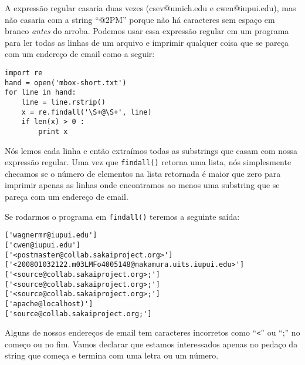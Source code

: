 A expressão regular casaria duas vezes (csev@umich.edu e cwen@iupui.edu), mas não casaria com a
string ``@2PM'' porque não há caracteres sem espaço em branco {\em antes} do arroba.
Podemos usar essa expressão regular em um programa para ler todas as linhas de um arquivo e 
imprimir qualquer coisa que se pareça com um endereço de email como a seguir: 

\beforeverb
\begin{verbatim}
import re
hand = open('mbox-short.txt')
for line in hand:
    line = line.rstrip()
    x = re.findall('\S+@\S+', line)
    if len(x) > 0 :
        print x
\end{verbatim}
\afterverb
%

Nós lemos cada linha e então extraímos todas as substrings que casam com nossa expressão regular.
Uma vez que {\tt findall()} retorna uma lista, nós simplesmente checamos se o número de elementos
na lista retornada é maior que zero para imprimir apenas as linhas onde encontramos ao menos uma 
substring que se pareça com um endereço de email.

Se rodarmos o programa em {\tt findall()} teremos a seguinte saída:

\beforeverb
\begin{verbatim}
['wagnermr@iupui.edu']
['cwen@iupui.edu']
['<postmaster@collab.sakaiproject.org>']
['<200801032122.m03LMFo4005148@nakamura.uits.iupui.edu>']
['<source@collab.sakaiproject.org>;']
['<source@collab.sakaiproject.org>;']
['<source@collab.sakaiproject.org>;']
['apache@localhost)']
['source@collab.sakaiproject.org;']
\end{verbatim}
\afterverb
%

Alguns de nossos endereços de email tem caracteres incorretos como ``\verb"<"'' ou ``;'' no 
começo ou no fim. Vamos declarar que estamos interessados apenas no pedaço da string que começa e
termina com uma letra ou um número.  

